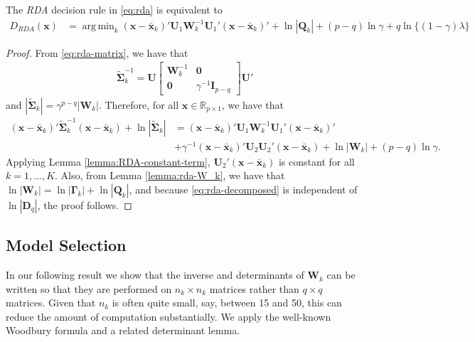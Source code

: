 \documentclass[11pt]{article}
\newcommand{\xbar}{\bar{\bm x}}
\DeclareMathOperator*{\argmin}{arg\,min}
\begin{document}
\begin{thm}
	The \emph{RDA} decision rule in \eqref{eq:rda} is equivalent to
	\begin{align}
		D_{RDA}(\bm x) &= \argmin_k (\bm x - \xbar_k)' \bm U_1 \bm W_k^{-1} \bm U_1' (\bm x - \xbar_k)' + \ln |\bm Q_k| + (p - q) \ln \gamma + q \ln \{ (1 - \gamma) \lambda \} \label{eq:rda-decomposed}
	\end{align}
	
\end{thm}
\begin{proof}
	From \eqref{eq:rda-matrix}, we have that
	\begin{align*}
		\tilde{\bm \Sigma}_k^{-1} = \bm U \begin{bmatrix}
			\bm W_k^{-1} & \bm 0\\
			\bm 0 & \gamma^{-1} \bm I_{p - q}
		\end{bmatrix} \bm U'
	\end{align*}
	and $|\tilde{\bm \Sigma}_k| = \gamma^{p-q} | \bm W_k |$. Therefore, for all $\bm x \in \mathbb{R}_{p \times 1}$, we have that
	\begin{align*}
	(\bm x - \xbar_k)' \tilde{\bm\Sigma}_k^{-1}(\bm x - \xbar_k)  + \ln |\tilde{\bm\Sigma}_k| &= (\bm x - \xbar_k)' \bm U_1 \bm W_k^{-1} \bm U_1' (\bm x - \xbar_k)'\\
	&+ \gamma^{-1} (\bm x - \xbar_k)' \bm U_2 \bm U_2' (\bm x - \xbar_k) + \ln | \bm W_k | + (p - q) \ln \gamma.
	\end{align*}
Applying Lemma \ref{lemma:RDA-constant-term}, $\bm U_2' (\bm x - \xbar_k)$ is constant for all $k = 1, \ldots, K$. Also, from Lemma \ref{lemma:rda-W_k}, we have that $\ln |\bm W_k| = \ln |\bm \Gamma_k| + \ln |\bm Q_k|$, and because \eqref{eq:rda-decomposed} is independent of $\ln |\bm D_q|$, the proof follows.
\end{proof}

\subsection{Model Selection}

In our following result we show that the inverse and determinants of $\bm W_k$ can be written so that they are performed on $n_k \times n_k$ matrices rather than $q \times q$ matrices. Given that $n_k$ is often quite small, say, between 15 and 50, this can reduce the amount of computation substantially. We apply the well-known Woodbury formula and a related determinant lemma.
\end{document}
